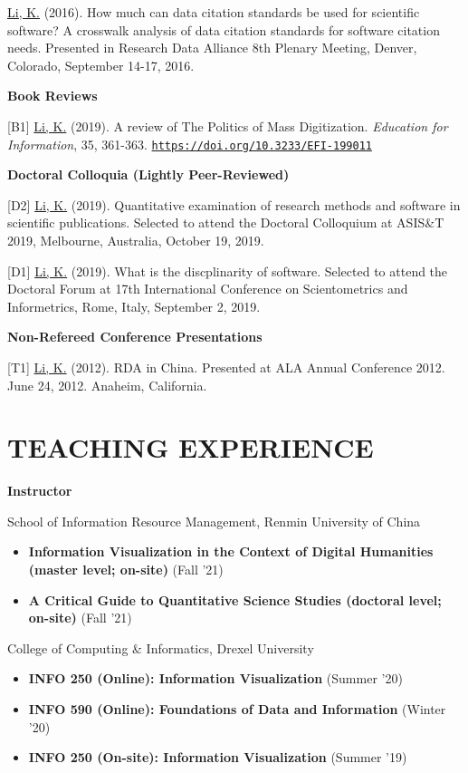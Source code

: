 \documentclass[margin, 10pt]{res} %
\begin{document}
\begin{resume}
[P1] \underline{Li, K.} (2016). How much can data citation standards be used for scientific software? A crosswalk analysis of data citation standards for software citation needs. Presented in Research Data Alliance 8th Plenary Meeting, Denver, Colorado, September 14-17, 2016.

\textbf{Book Reviews}

[B1] \underline{Li, K.} (2019). A review of The Politics of Mass Digitization. \textit{Education for Information}, 35, 361-363. \href{https://doi.org/10.3233/EFI-199011}{\nolinkurl{https://doi.org/10.3233/EFI-199011}}

\textbf{Doctoral Colloquia (Lightly Peer-Reviewed)}

[D2] \underline{Li, K.} (2019). Quantitative examination of research methods and software in scientific publications. Selected to attend the Doctoral Colloquium at ASIS\&T 2019, Melbourne, Australia, October 19, 2019.

[D1] \underline{Li, K.} (2019). What is the discplinarity of software. Selected to attend the Doctoral Forum at 17th International Conference on Scientometrics and Informetrics, Rome, Italy, September 2, 2019.

\textbf{Non-Refereed Conference Presentations}

[T1] \underline{Li, K.} (2012). RDA in China. Presented at ALA Annual Conference 2012. June 24, 2012. Anaheim, California.

\section{TEACHING EXPERIENCE}

\textbf{Instructor}

School of Information Resource Management, Renmin University of China
\begin{itemize}
\item \textbf{Information Visualization in the Context of Digital Humanities (master level; on-site)} (Fall '21)
\item \textbf{A Critical Guide to Quantitative Science Studies (doctoral level; on-site)} (Fall '21)
\end{itemize}

College of Computing \& Informatics, Drexel University

\begin{itemize}
\item \textbf{INFO 250 (Online): Information Visualization} (Summer '20)
\item \textbf{INFO 590 (Online): Foundations of Data and Information} (Winter '20)
\item \textbf{INFO 250 (On-site): Information Visualization} (Summer '19)
\end{itemize}


\end{resume}
\end{document}

